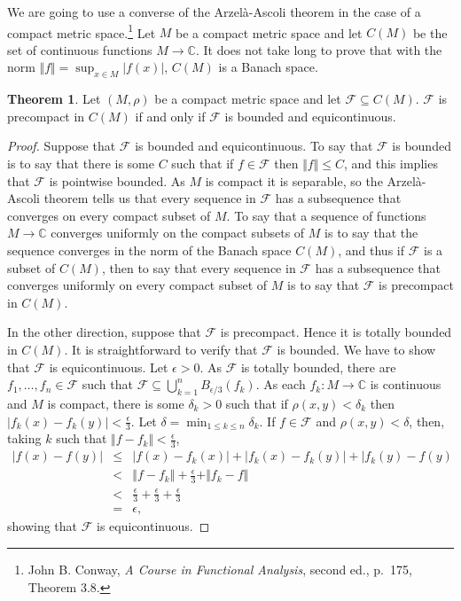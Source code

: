 \documentclass{article}
\newcommand{\norm}[1]{\Vert #1 \Vert}
\theoremstyle{definition}
\newtheorem{theorem}{Theorem}
\begin{document}
We are going to use a converse of
the Arzel\`a-Ascoli theorem in the case of a compact metric space.\footnote{John B. Conway, {\em A Course in Functional Analysis}, second ed.,
p.~175, Theorem 3.8.}
Let $M$ be a compact metric space and let $C(M)$ be the set of continuous functions $M \to \mathbb{C}$.
It does not take long to prove that with the norm $\norm{f} = \sup_{x \in M} |f(x)|$, $C(M)$ is a Banach space. 

\begin{theorem}
Let $(M,\rho)$ be a compact metric space and let $\mathcal{F} \subseteq C(M)$. $\mathcal{F}$ is precompact
in $C(M)$ if and only if $\mathcal{F}$ is bounded and equicontinuous.
\label{ascoli}
\end{theorem}
\begin{proof}
Suppose that $\mathcal{F}$ is bounded and equicontinuous. To say that $\mathcal{F}$ is bounded is to say that there is some $C$ such that if $f \in \mathcal{F}$ then $\norm{f} \leq C$, and this implies that
$\mathcal{F}$ is pointwise bounded. As $M$ is compact it is separable, so the Arzel\`a-Ascoli theorem tells us that every sequence in $\mathcal{F}$ has a subsequence
that converges on every compact subset of $M$.
To say that a sequence of functions $M \to \mathbb{C}$ converges uniformly on the compact subsets of $M$ is to say that
the sequence converges in the norm of the Banach space $C(M)$, and thus if $\mathcal{F}$ is a subset of $C(M)$, then to say that every sequence in
$\mathcal{F}$ has a subsequence that converges uniformly on every compact subset of $M$ is to say that $\mathcal{F}$ is precompact in $C(M)$.

In the other direction,
suppose that $\mathcal{F}$ is precompact. Hence it is totally bounded in $C(M)$. It is straightforward to verify that $\mathcal{F}$ is bounded.
We have
to show that $\mathcal{F}$ is equicontinuous. Let $\epsilon>0$. As $\mathcal{F}$ is totally bounded, there are $f_1,\ldots,f_n \in \mathcal{F}$ such that
$\mathcal{F} \subseteq \bigcup_{k=1}^n B_{\epsilon/3}(f_k)$. 
As each $f_k:M \to \mathbb{C}$ is continuous and $M$ is compact, there is some $\delta_k>0$ such that if $\rho(x,y)<\delta_k$ then $|f_k(x)-f_k(y)|<\frac{\epsilon}{3}$.
Let $\delta=\min_{1 \leq k \leq n} \delta_k$.
If $f \in \mathcal{F}$ and $\rho(x,y)<\delta$, then, taking $k$ such that $\norm{f-f_k} < \frac{\epsilon}{3}$,
\begin{eqnarray*}
|f(x)-f(y)| &\leq& |f(x)-f_k(x)| + |f_k(x)-f_k(y)| + |f_k(y)-f(y)\\
&<&\norm{f-f_k} + \frac{\epsilon}{3} + \norm{f_k-f}\\
&<&\frac{\epsilon}{3} + \frac{\epsilon}{3} + \frac{\epsilon}{3}\\
&=&\epsilon,
\end{eqnarray*}
showing that $\mathcal{F}$ is equicontinuous.
\end{proof}
\end{document}

